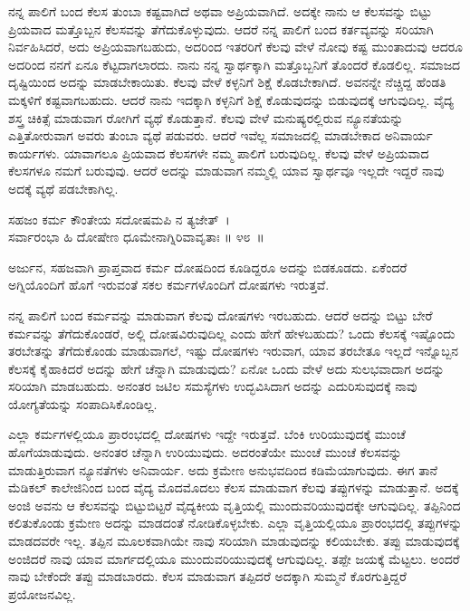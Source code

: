 ನನ್ನ ಪಾಲಿಗೆ ಬಂದ ಕೆಲಸ ತುಂಬಾ ಕಷ್ಟವಾಗಿದೆ ಅಥವಾ ಅಪ್ರಿಯವಾಗಿದೆ. ಅದಕ್ಕೇ ನಾನು ಆ ಕೆಲಸವನ್ನು ಬಿಟ್ಟು ಪ್ರಿಯವಾದ ಮತ್ತೊಬ್ಬನ ಕೆಲಸವನ್ನು ತೆಗೆದುಕೊಳ್ಳುವುದು. ಆದರೆ ನನ್ನ ಪಾಲಿಗೆ ಬಂದ ಕರ್ತವ್ಯವನ್ನು ಸರಿಯಾಗಿ ನಿರ್ವಹಿಸಿದರೆ, ಅದು ಅಪ್ರಿಯವಾಗಬಹುದು, ಅದರಿಂದ ಇತರರಿಗೆ ಕೆಲವು ವೇಳೆ ನೋವು ಕಷ್ಟ ಮುಂತಾದುವು ಆದರೂ ಅದರಿಂದ ನನಗೆ ಏನೂ ಕೆಟ್ಟದಾಗಲಾರದು. ನಾನು ನನ್ನ ಸ್ವಾರ್ಥಕ್ಕಾಗಿ ಮತ್ತೊಬ್ಬನಿಗೆ ತೊಂದರೆ ಕೊಡಲಿಲ್ಲ. ಸಮಾಜದ ದೃಷ್ಟಿಯಿಂದ ಅದನ್ನು ಮಾಡಬೇಕಾಯಿತು. ಕೆಲವು ವೇಳೆ ಕಳ್ಳನಿಗೆ ಶಿಕ್ಷೆ ಕೊಡಬೇಕಾಗಿದೆ. ಅವನನ್ನೇ ನೆಚ್ಚಿದ್ದ ಹೆಂಡತಿ ಮಕ್ಕಳಿಗೆ ಕಷ್ಟವಾಗಬಹುದು. ಆದರೆ ನಾನು ಇದಕ್ಕಾಗಿ ಕಳ್ಳನಿಗೆ ಶಿಕ್ಷೆ ಕೊಡುವುದನ್ನು ಬಿಡುವುದಕ್ಕೆ ಆಗುವುದಿಲ್ಲ. ವೈದ್ಯ ಶಸ್ತ್ರ ಚಿಕಿತ್ಸೆ ಮಾಡುವಾಗ ರೋಗಿಗೆ ವ್ಯಥೆ ಕೊಡುತ್ತಾನೆ. ಕೆಲವು ವೇಳೆ ಮನುಷ್ಯರಲ್ಲಿರುವ ನ್ಯೂನತೆಯನ್ನು ಎತ್ತಿತೋರುವಾಗ ಅವರು ತುಂಬಾ ವ್ಯಥೆ ಪಡುವರು. ಆದರೆ ಇವೆಲ್ಲ ಸಮಾಜದಲ್ಲಿ ಮಾಡಬೇಕಾದ ಅನಿವಾರ್ಯ ಕಾರ್ಯಗಳು. ಯಾವಾಗಲೂ ಪ್ರಿಯವಾದ ಕೆಲಸಗಳೇ ನಮ್ಮ ಪಾಲಿಗೆ ಬರುವುದಿಲ್ಲ. ಕೆಲವು ವೇಳೆ ಅಪ್ರಿಯವಾದ ಕೆಲಸಗಳೂ ನಮಗೆ ಬರುವುವು. ಆದರೆ ಅದನ್ನು ಮಾಡುವಾಗ ನಮ್ಮಲ್ಲಿ ಯಾವ ಸ್ವಾರ್ಥವೂ ಇಲ್ಲದೇ ಇದ್ದರೆ ನಾವು ಅದಕ್ಕೆ ವ್ಯಥೆ ಪಡಬೇಕಾಗಿಲ್ಲ.

\begin{shloka}
ಸಹಜಂ ಕರ್ಮ ಕೌಂತೇಯ ಸದೋಷಮಪಿ ನ ತ್ಯಜೇತ್~।\\ಸರ್ವಾರಂಭಾ ಹಿ ದೋಷೇಣ ಧೂಮೇನಾಗ್ನಿರಿವಾವೃತಾಃ \hfill॥ ೪೮~॥
\end{shloka}

\begin{artha}
ಅರ್ಜುನ, ಸಹಜವಾಗಿ ಪ್ರಾಪ್ತವಾದ ಕರ್ಮ ದೋಷದಿಂದ ಕೂಡಿದ್ದರೂ ಅದನ್ನು ಬಿಡಕೂಡದು. ಏಕೆಂದರೆ ಅಗ್ನಿಯೊಂದಿಗೆ ಹೊಗೆ ಇರುವಂತೆ ಸಕಲ ಕರ್ಮಗಳೊಂದಿಗೆ ದೋಷಗಳು ಇರುತ್ತವೆ.
\end{artha}

ನನ್ನ ಪಾಲಿಗೆ ಬಂದ ಕರ್ಮವನ್ನು ಮಾಡುವಾಗ ಕೆಲವು ದೋಷಗಳು ಇರಬಹುದು. ಆದರೆ ಅದನ್ನು ಬಿಟ್ಟು ಬೇರೆ ಕರ್ಮವನ್ನು ತೆಗೆದುಕೊಂಡರೆ, ಅಲ್ಲಿ ದೋಷವಿರುವುದಿಲ್ಲ ಎಂದು ಹೇಗೆ ಹೇಳಬಹುದು? ಒಂದು ಕೆಲಸಕ್ಕೆ ಇಷ್ಟೊಂದು ತರಬೇತನ್ನು ತೆಗೆದುಕೊಂಡು ಮಾಡುವಾಗಲೆ, ಇಷ್ಟು ದೋಷಗಳು ಇರುವಾಗ, ಯಾವ ತರಬೇತೂ ಇಲ್ಲದೆ ಇನ್ನೊಬ್ಬನ ಕೆಲಸಕ್ಕೆ ಕೈಹಾಕಿದರೆ ಅದನ್ನು ಹೇಗೆ ಚೆನ್ನಾಗಿ ಮಾಡುವುದು? ಏನೋ ಒಂದು ವೇಳೆ ಅದು ಸುಲಭವಾದಾಗ ಅದನ್ನು ಸರಿಯಾಗಿ ಮಾಡಬಹುದು. ಅನಂತರ ಜಟಿಲ ಸಮಸ್ಯೆಗಳು ಉದ್ಭವಿಸಿದಾಗ ಅದನ್ನು ಎದುರಿಸುವುದಕ್ಕೆ ನಾವು ಯೋಗ್ಯತೆಯನ್ನು ಸಂಪಾದಿಸಿಕೊಂಡಿಲ್ಲ.

ಎಲ್ಲಾ ಕರ್ಮಗಳಲ್ಲಿಯೂ ಪ್ರಾರಂಭದಲ್ಲಿ ದೋಷಗಳು ಇದ್ದೇ ಇರುತ್ತವೆ. ಬೆಂಕಿ ಉರಿಯುವುದಕ್ಕೆ ಮುಂಚೆ ಹೊಗೆಯಾಡುವುದು. ಅನಂತರ ಚೆನ್ನಾಗಿ ಉರಿಯುವುದು. ಅದರಂತೆಯೇ ಮುಂಚೆ ಮುಂಚೆ ಕೆಲಸವನ್ನು ಮಾಡುತ್ತಿರುವಾಗ ನ್ಯೂನತೆಗಳು ಅನಿವಾರ್ಯ. ಅದು ಕ್ರಮೇಣ ಅನುಭವದಿಂದ ಕಡಿಮೆಯಾಗುವುದು. ಈಗ ತಾನೆ ಮೆಡಿಕಲ್ ಕಾಲೇಜಿನಿಂದ ಬಂದ ವೈದ್ಯ ಮೊದಮೊದಲು ಕೆಲಸ ಮಾಡುವಾಗ ಕೆಲವು ತಪ್ಪುಗಳನ್ನು ಮಾಡುತ್ತಾನೆ. ಅದಕ್ಕೆ ಅಂಜಿ ಅವನು ಆ ಕೆಲಸವನ್ನು ಬಿಟ್ಟುಬಿಟ್ಟರೆ ವೈದ್ಯಕೀಯ ವೃತ್ತಿಯಲ್ಲಿ ಮುಂದುವರಿಯುವುದಕ್ಕೇ ಆಗುವುದಿಲ್ಲ. ತಪ್ಪಿನಿಂದ ಕಲಿತುಕೊಂಡು ಕ್ರಮೇಣ ಅದನ್ನು ಮಾಡದಂತೆ ನೋಡಿಕೊಳ್ಳಬೇಕು. ಎಲ್ಲಾ ವೃತ್ತಿ\-ಯಲ್ಲಿಯೂ ಪ್ರಾರಂಭದಲ್ಲಿ ತಪ್ಪುಗಳನ್ನು ಮಾಡದವರೇ ಇಲ್ಲ. ತಪ್ಪಿನ ಮೂಲಕವಾಗಿಯೇ ನಾವು ಸರಿಯಾಗಿ ಮಾಡುವುದನ್ನು ಕಲಿಯಬೇಕು. ತಪ್ಪು ಮಾಡುವುದಕ್ಕೆ ಅಂಜಿದರೆ ನಾವು ಯಾವ ಮಾರ್ಗದಲ್ಲಿಯೂ ಮುಂದುವರಿಯುವುದಕ್ಕೆ ಆಗುವುದಿಲ್ಲ. ತಪ್ಪೇ ಜಯಕ್ಕೆ ಮೆಟ್ಟಲು. ಅಂದರೆ ನಾವು ಬೇಕೆಂದೇ ತಪ್ಪು ಮಾಡಬಾರದು. ಕೆಲಸ ಮಾಡುವಾಗ ತಪ್ಪಿದರೆ ಅದಕ್ಕಾಗಿ ಸುಮ್ಮನೆ ಕೊರಗುತ್ತಿದ್ದರೆ ಪ್ರಯೋಜನವಿಲ್ಲ.

